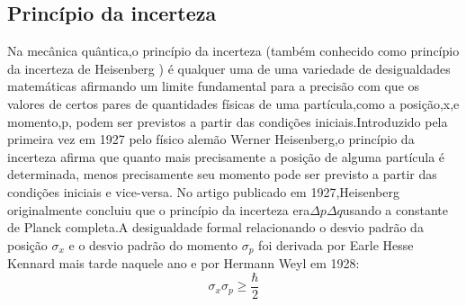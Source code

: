 \documentclass{report}
\begin{document}
\subsection{Princípio da incerteza}
Na mecânica quântica,o princípio da incerteza (também conhecido como princípio da incerteza de Heisenberg ) é qualquer uma de uma variedade de desigualdades matemáticas afirmando um limite fundamental para a precisão com que os valores de certos pares de quantidades físicas de uma partícula,como a posição,x,e momento,p, podem ser previstos a partir das condições iniciais.Introduzido pela primeira vez em 1927 pelo físico alemão Werner Heisenberg,o princípio da incerteza afirma que quanto mais precisamente a posição de alguma partícula é determinada, menos precisamente seu momento pode ser previsto a partir das condições iniciais e vice-versa. No artigo publicado em 1927,Heisenberg originalmente concluiu que o princípio da incerteza era\(\Delta p \Delta q\)usando a constante de Planck completa.A desigualdade formal relacionando o desvio padrão da posição \(\sigma_x\) e o desvio padrão do momento \(\sigma_p\) foi derivada por Earle Hesse Kennard mais tarde naquele ano e por Hermann Weyl em 1928:
\begin{equation}
    \sigma_x \sigma_p \geq \frac{\hbar}{2}
\end{equation}
\end{document}
